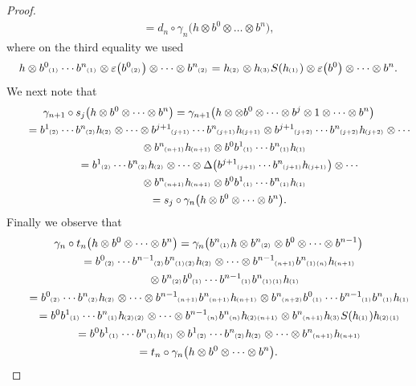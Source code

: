 \documentclass[pdftex]{sigma}
\numberwithin{equation}{section}
\newcommand{\ps}[1]{~\hspace{-4pt}_{^{(#1)}}}
\begin{document}
\begin{proof}
\begin{gather*}
=d_n\circ \gamma_n \big(h\otimes b^0\otimes\dots\otimes b^n\big),
\end{gather*}
where on the third equality we used
\begin{gather*}
h\otimes b^0\ps{1}\cdots b^n\ps{1}\otimes \varepsilon\big(b^0\ps{2}\big)\otimes\cdots\otimes b^n\ps{2} =h\ps{2}\otimes
h\ps{3}S(h\ps{1}) \otimes \varepsilon\big(b^0\big)\otimes\cdots\otimes b^n.
\end{gather*}
We next note that
\begin{gather*}
\gamma_{n+1}\circ s_j\big(h\otimes b^0\otimes\cdots\otimes b^n\big) =\gamma_{n+1}\big(h\otimes \otimes b^0\otimes\cdots\otimes
b^j\otimes 1\otimes\cdots\otimes b^n\big)
\\
\qquad
=b^1\ps{2}\cdots b^n\ps{2}h\ps{2} \otimes\cdots\otimes b^{j+1}\ps{j+1}\cdots b^n\ps{j+1}h\ps{j+1}\otimes
b^{j+1}\ps{j+2}\cdots b^n\ps{j+2}h\ps{j+2} \otimes\cdots
\\
\qquad
\phantom{=}{}
\otimes b^n\ps{n+1}h\ps{n+1}\otimes b^0b^1\ps{1}\cdots b^n\ps{1}h\ps{1}
\\
\qquad
=b^1\ps{2}\cdots b^n\ps{2}h\ps{2} \otimes\cdots\otimes \Delta\big(b^{j+1}\ps{j+1}\cdots b^n\ps{j+1}h\ps{j+1}\big) \otimes\cdots
\\
\qquad
\phantom{=}{}
\otimes b^n\ps{n+1}h\ps{n+1}\otimes b^0b^1\ps{1}\cdots b^n\ps{1}h\ps{1}
\\
\qquad
=s_j \circ \gamma_n\big(h\otimes b^0\otimes\cdots\otimes b^n\big).
\end{gather*}
Finally we observe that
\begin{gather*}
\gamma_n\circ t_n\big(h\otimes b^0\otimes\cdots\otimes b^n\big) =\gamma_n\big(b^n\ps{1}h\otimes b^n\ps{2}\otimes
b^0\otimes\cdots\otimes b^{n-1}\big)
\\
\qquad
=b^0\ps{2}\cdots b^{n-1}\ps{2}b^n\ps{1}\ps{2}h\ps{2} \otimes\cdots\otimes b^{n-1}\ps{n+1}b^n\ps{1}\ps{n}h\ps{n+1}\\
\qquad\hphantom{=}{}
\otimes
b^n\ps{2}b^0\ps{1}\cdots b^{n-1}\ps{1}b^n\ps{1}\ps{1}h\ps{1}
\\
\qquad
=b^0\ps{2}\cdots b^n\ps{2}h\ps{2} \otimes\cdots\otimes b^{n-1}\ps{n+1}b^n\ps{n+1}h\ps{n+1}\otimes
b^n\ps{n+2}b^0\ps{1}\cdots b^{n-1}\ps{1}b^n\ps{1}h\ps{1}
\\
\qquad
=b^0b^1\ps{1}\cdots b^n\ps{1}h\ps{2}\ps{2} \otimes\cdots\otimes b^{n-1}\ps{n}b^n\ps{n}h\ps{2}\ps{n+1}\otimes
b^n\ps{n+1}h\ps{3}S(h\ps{1})h\ps{2}\ps{1}
\\
\qquad
=b^0b^1\ps{1}\cdots b^n\ps{1}h\ps{1}\otimes b^1\ps{2}\cdots b^n\ps{2}h\ps{2} \otimes\cdots\otimes b^n\ps{n+1}h\ps{n+1}
\\
\qquad
=t_n \circ \gamma_n\big(h\otimes b^0\otimes\cdots\otimes b^n\big).  \tag*{\qed}
\end{gather*}
\renewcommand{\qed}{}
\end{proof}
\end{document}
